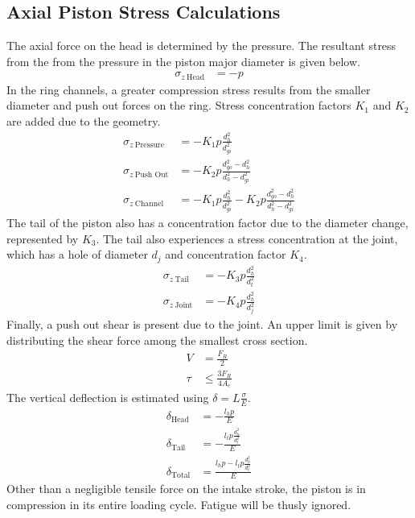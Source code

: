 \documentclass[10pt,a4paper]{article}
\begin{document}
	\subsection*{Axial Piston Stress Calculations}
	The axial force on the head is determined by the pressure. The resultant stress from the from the pressure in the piston major diameter is given below.
	\begin{align}
		\sigma_{z\ \text{Head}} &= - p
	\end{align}
	In the ring channels, a greater compression stress results from the smaller diameter and push out forces on the ring. Stress concentration factors $K_1$ and $K_2$ are added due to the geometry.
	\begin{align}
		\sigma_{z\ \text{Pressure}} &= - K_1 p \frac{d_h^2}{d_{gi}^2} \\
		\sigma_{z\ \text{Push Out}} &= - K_2 p \frac{d_{go}^2 - d_h^2}{d_h^2 - d_{gi}^2}\\
		\sigma_{z\ \text{Channel}} &= - K_1 p \frac{d_h^2}{d_{gi}^2} - K_2 p \frac{d_{go}^2 - d_h^2}{d_h^2 - d_{gi}^2}
	\end{align}
	The tail of the piston also has a concentration factor due to the diameter change, represented by $K_3$. The tail also experiences a stress concentration at the joint, which has a hole of diameter $d_j$ and concentration factor $K_4$.
	\begin{align}
		\sigma_{z\ \text{Tail}} &= -K_3 p \frac{d_h^2}{d_t^2}\\
		\sigma_{z\ \text{Joint}} &= - K_4 p \frac{d_h^2}{d_j^2}
	\end{align}
	Finally, a push out shear is present due to the joint. An upper limit is given by distributing the shear force among the smallest cross section.
	\begin{align}
		V &= \frac{F_R}{2}\\
		\tau &\leq \frac{3 F_R}{4 A_c}
	\end{align}
	The vertical deflection is estimated using $\delta = L \frac{\sigma}{E}$.
	\begin{align}
		\delta_{\text{Head}} &= - \frac{l_h p}{E}\\ 
		\delta_{\text{Tail}} &= - \frac{l_t p \frac{d_h^2}{d_t^2}}{E}\\ 
		\delta_{\text{Total}} &=  \frac{l_h p -l_t p \frac{d_h^2}{d_t^2}}{E}
	\end{align}
	Other than a negligible tensile force on the intake stroke, the piston is in compression in its entire loading cycle. Fatigue will be thusly ignored.
\end{document}
